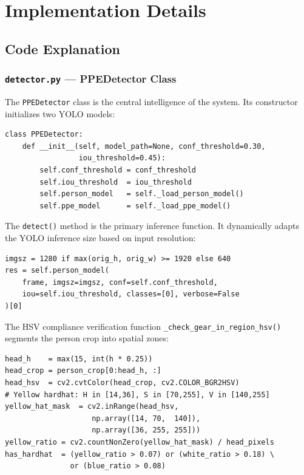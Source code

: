 \documentclass[12pt,a4paper]{report}
\begin{document}
\chapter{Implementation Details}

\section{Code Explanation}

\subsection*{\texttt{detector.py} — PPEDetector Class}

The \texttt{PPEDetector} class is the central intelligence of the system. Its constructor initializes two YOLO models:

\begin{lstlisting}[caption={PPEDetector class initialization (detector.py)}]
class PPEDetector:
    def __init__(self, model_path=None, conf_threshold=0.30,
                 iou_threshold=0.45):
        self.conf_threshold = conf_threshold
        self.iou_threshold  = iou_threshold
        self.person_model   = self._load_person_model()
        self.ppe_model      = self._load_ppe_model()
\end{lstlisting}

The \texttt{detect()} method is the primary inference function. It dynamically adapts the YOLO inference size based on input resolution:

\begin{lstlisting}[caption={Adaptive inference size selection (detector.py)}]
imgsz = 1280 if max(orig_h, orig_w) >= 1920 else 640
res = self.person_model(
    frame, imgsz=imgsz, conf=self.conf_threshold,
    iou=self.iou_threshold, classes=[0], verbose=False
)[0]
\end{lstlisting}

The HSV compliance verification function \texttt{\_check\_gear\_in\_region\_hsv()} segments the person crop into spatial zones:

\begin{lstlisting}[caption={HSV Helmet detection in head region (detector.py)}]
head_h    = max(15, int(h * 0.25))
head_crop = person_crop[0:head_h, :]
head_hsv  = cv2.cvtColor(head_crop, cv2.COLOR_BGR2HSV)
# Yellow hardhat: H in [14,36], S in [70,255], V in [140,255]
yellow_hat_mask  = cv2.inRange(head_hsv,
                    np.array([14, 70,  140]),
                    np.array([36, 255, 255]))
yellow_ratio = cv2.countNonZero(yellow_hat_mask) / head_pixels
has_hardhat  = (yellow_ratio > 0.07) or (white_ratio > 0.18) \
               or (blue_ratio > 0.08)
\end{lstlisting}
\end{document}
